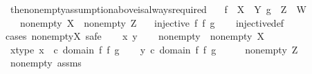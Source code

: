 \begin{isabellebody}
\begin{isamarkuptext}
\end{isamarkuptext}\isamarkuptrue%
\isamarkupfalse%
\ the{\isacharunderscore}{\kern0pt}nonempty{\isacharunderscore}{\kern0pt}assumption{\isacharunderscore}{\kern0pt}above{\isacharunderscore}{\kern0pt}is{\isacharunderscore}{\kern0pt}always{\isacharunderscore}{\kern0pt}required{\isacharcolon}{\kern0pt}\isanewline
\ \ \ {\isachardoublequoteopen}f\ {\isacharcolon}{\kern0pt}\ X\ {\isasymrightarrow}\ Y{\isachardoublequoteclose}\ {\isachardoublequoteopen}g\ {\isacharcolon}{\kern0pt}\ Z\ {\isasymrightarrow}\ W{\isachardoublequoteclose}\isanewline
\ \ \ {\isachardoublequoteopen}{\isasymnot}{\isacharparenleft}{\kern0pt}nonempty\ X{\isacharparenright}{\kern0pt}\ {\isasymor}\ {\isasymnot}{\isacharparenleft}{\kern0pt}nonempty\ Z{\isacharparenright}{\kern0pt}{\isachardoublequoteclose}\isanewline
\ \ \ {\isachardoublequoteopen}injective\ {\isacharparenleft}{\kern0pt}f\ {\isasymtimes}\isactrlsub f\ g{\isacharparenright}{\kern0pt}{\isachardoublequoteclose}\isanewline
%
\isadelimproof
\ \ %
\endisadelimproof
%
\isatagproof
{}\isamarkupfalse%
\ injective{\isacharunderscore}{\kern0pt}def\ \isanewline
{}\isamarkupfalse%
{\isacharparenleft}{\kern0pt}cases\ {\isachardoublequoteopen}nonempty{\isacharparenleft}{\kern0pt}X{\isacharparenright}{\kern0pt}{\isachardoublequoteclose}{\isacharcomma}{\kern0pt}\ safe{\isacharparenright}{\kern0pt}\isanewline
\ \ \isamarkupfalse%
\ x\ y\isanewline
\ \ \isamarkupfalse%
\ nonempty{\isacharcolon}{\kern0pt}\ \ {\isachardoublequoteopen}nonempty\ X{\isachardoublequoteclose}\isanewline
\ \ \isamarkupfalse%
\ x{\isacharunderscore}{\kern0pt}type{\isacharcolon}{\kern0pt}\ {\isachardoublequoteopen}x\ \ {\isasymin}\isactrlsub c\ domain\ {\isacharparenleft}{\kern0pt}f\ {\isasymtimes}\isactrlsub f\ g{\isacharparenright}{\kern0pt}{\isachardoublequoteclose}\isanewline
\ \ \isamarkupfalse%
\ {\isachardoublequoteopen}y\ {\isasymin}\isactrlsub c\ domain\ {\isacharparenleft}{\kern0pt}f\ {\isasymtimes}\isactrlsub f\ g{\isacharparenright}{\kern0pt}{\isachardoublequoteclose}\isanewline
\ \ \isamarkupfalse%
\ \isamarkupfalse%
\ {\isachardoublequoteopen}{\isasymnot}{\isacharparenleft}{\kern0pt}nonempty\ Z{\isacharparenright}{\kern0pt}{\isachardoublequoteclose}\isanewline
\ \ \ \ \isamarkupfalse%
\ nonempty\ assms{\isacharparenleft}{\kern0pt}{}{\isacharparenright}{\kern0pt}\ \isamarkupfalse%

\end{isabellebody}
